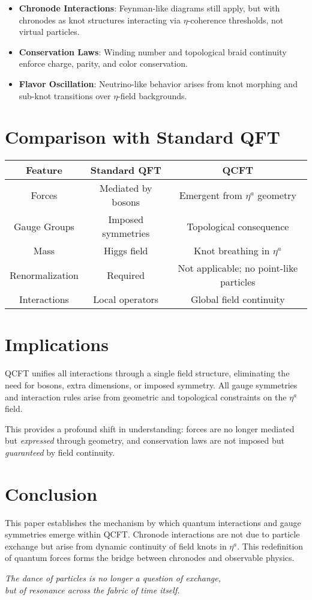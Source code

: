 \documentclass[12pt]{article}
\begin{document}
\begin{itemize}
\item \textbf{Chronode Interactions}: Feynman-like diagrams still apply, but with chronodes as knot structures interacting via $\eta$-coherence thresholds, not virtual particles.
\item \textbf{Conservation Laws}: Winding number and topological braid continuity enforce charge, parity, and color conservation.
\item \textbf{Flavor Oscillation}: Neutrino-like behavior arises from knot morphing and sub-knot transitions over $\eta$-field backgrounds.
\end{itemize}

\section{Comparison with Standard QFT}

\begin{tabular}{|c|c|c|}
\hline
Feature & Standard QFT & QCFT \\
\hline
Forces & Mediated by bosons & Emergent from $\eta^a$ geometry \\
Gauge Groups & Imposed symmetries & Topological consequence \\
Mass & Higgs field & Knot breathing in $\eta^a$ \\
Renormalization & Required & Not applicable; no point-like particles \\
Interactions & Local operators & Global field continuity \\
\hline
\end{tabular}

\section{Implications}

QCFT unifies all interactions through a single field structure, eliminating the need for bosons, extra dimensions, or imposed symmetry. All gauge symmetries and interaction rules arise from geometric and topological constraints on the $\eta^a$ field.

This provides a profound shift in understanding: forces are no longer mediated but \emph{expressed} through geometry, and conservation laws are not imposed but \emph{guaranteed} by field continuity.

\section*{Conclusion}

This paper establishes the mechanism by which quantum interactions and gauge symmetries emerge within QCFT. Chronode interactions are not due to particle exchange but arise from dynamic continuity of field knots in $\eta^a$. This redefinition of quantum forces forms the bridge between chronodes and observable physics.

\begin{center}
\emph{The dance of particles is no longer a question of exchange,\\
but of resonance across the fabric of time itself.}
\end{center}
\end{document}
